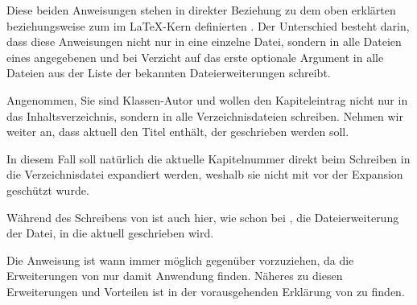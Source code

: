 \begin{Declaration}
\end{Declaration}
Diese beiden Anweisungen stehen in direkter Beziehung zu dem oben erklärten
beziehungsweise zum im \LaTeX-Kern definierten . Der
Unterschied besteht darin, dass diese Anweisungen  nicht nur in
eine einzelne Datei, sondern in alle Dateien eines angegebenen
 und bei Verzicht auf das erste optionale Argument in alle
Dateien aus der Liste der bekannten Dateierweiterungen schreibt.
\begin{Example}
  Angenommen, Sie sind Klassen-Autor und wollen den Kapiteleintrag nicht nur in
  das Inhaltsverzeichnis, sondern in alle Verzeichnisdateien schreiben. Nehmen
  wir weiter an, dass aktuell  den Titel enthält, der geschrieben
  werden soll.
  In diesem Fall soll natürlich die aktuelle Kapitelnummer direkt beim
  Schreiben in die Verzeichnisdatei expandiert werden, weshalb sie nicht mit
   vor der Expansion geschützt wurde.
\end{Example}
Während des Schreibens von  ist auch hier, wie schon bei
,
 die
Dateierweiterung der Datei, in die aktuell geschrieben wird.%

Die Anweisung
 ist wann immer möglich gegenüber
 vorzuziehen, da die Erweiterungen von
 nur damit Anwendung finden. Näheres
zu diesen Erweiterungen und Vorteilen ist in der vorausgehenden Erklärung von
 zu finden.%
%
\EndIndexGroup


